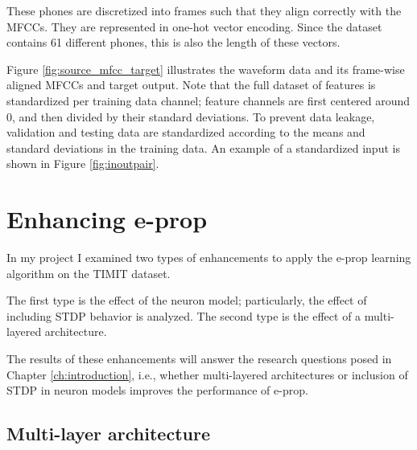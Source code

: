 			These phones are discretized into frames such that they align correctly with the MFCCs.
			They are represented in one-hot vector encoding.
			Since the dataset contains 61 different phones, this is also the length of these vectors.

			Figure \ref{fig:source_mfcc_target} illustrates the waveform data and its frame-wise aligned MFCCs and target output.
			Note that the full dataset of features is standardized per training data channel; feature channels are first centered around 0, and then divided by their standard deviations.
			To prevent data leakage, validation and testing data are standardized according to the means and standard deviations in the training data.
			An example of a standardized input is shown in Figure \ref{fig:inoutpair}.

\newpage


\section{Enhancing e-prop}
	In my project I examined two types of enhancements to apply the e-prop learning algorithm on the TIMIT dataset.

	The first type is the effect of the neuron model; particularly, the effect of including STDP behavior is analyzed.
	The second type is the effect of a multi-layered architecture.

	The results of these enhancements will answer the research questions posed in Chapter \ref{ch:introduction}, i.e., whether multi-layered architectures or inclusion of STDP in neuron models improves the performance of e-prop.

	\subsection{Multi-layer architecture}\label{sec:ml_arch}


